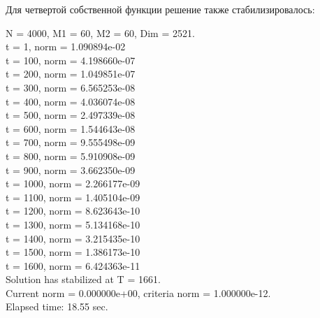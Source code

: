 \documentclass[12pt,a4paper]{article}
\begin{document}
Для четвертой собственной функции решение также стабилизировалось:
\begin{center}
N = 4000, M1 =  60, M2 =  60, Dim =   2521.                    \\
t =   1, norm = 1.090894e-02                                   \\
t = 100, norm = 4.198660e-07                                   \\
t = 200, norm = 1.049851e-07                                   \\
t = 300, norm = 6.565253e-08                                   \\
t = 400, norm = 4.036074e-08                                   \\
t = 500, norm = 2.497339e-08                                   \\
t = 600, norm = 1.544643e-08                                   \\
t = 700, norm = 9.555498e-09                                   \\
t = 800, norm = 5.910908e-09                                   \\
t = 900, norm = 3.662350e-09                                   \\
t = 1000, norm = 2.266177e-09                                  \\
t = 1100, norm = 1.405104e-09                                  \\
t = 1200, norm = 8.623643e-10                                  \\
t = 1300, norm = 5.134168e-10                                  \\
t = 1400, norm = 3.215435e-10                                  \\
t = 1500, norm = 1.386173e-10                                  \\
t = 1600, norm = 6.424363e-11                                  \\
Solution has stabilized at T = 1661.                           \\
Current norm = 0.000000e+00, criteria norm = 1.000000e-12.     \\
Elapsed time: 18.55 sec.
\end{center}
\end{document}
